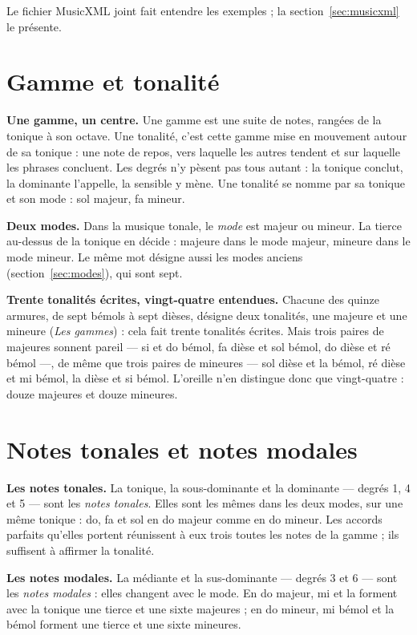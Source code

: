 \documentclass[a4paper,11pt]{article}
\begin{document}
Le fichier MusicXML joint fait entendre les exemples ; la
section~\ref{sec:musicxml} le présente.

\section{Gamme et tonalité}
\label{sec:tonalite}

\textbf{Une gamme, un centre.} Une gamme est une suite de notes, rangées de la
tonique à son octave. Une tonalité, c'est cette gamme mise en mouvement autour
de sa tonique : une note de repos, vers laquelle les autres tendent et sur
laquelle les phrases concluent. Les degrés n'y pèsent pas tous autant : la
tonique conclut, la dominante l'appelle, la sensible y mène. Une tonalité se
nomme par sa tonique et son mode : sol majeur, fa mineur.

\textbf{Deux modes.} Dans la musique tonale, le \emph{mode} est majeur ou
mineur. La tierce au-dessus de la tonique en décide : majeure dans le mode
majeur, mineure dans le mode mineur. Le même mot désigne aussi les modes
anciens (section~\ref{sec:modes}), qui sont sept.

\textbf{Trente tonalités écrites, vingt-quatre entendues.} Chacune des quinze
armures, de sept bémols à sept dièses, désigne deux tonalités, une majeure et
une mineure (\emph{Les gammes}) : cela fait trente tonalités écrites. Mais
trois paires de majeures sonnent pareil --- si et do bémol, fa dièse et sol
bémol, do dièse et ré bémol ---, de même que trois paires de mineures --- sol
dièse et la bémol, ré dièse et mi bémol, la dièse et si bémol. L'oreille n'en
distingue donc que vingt-quatre : douze majeures et douze mineures.

\section{Notes tonales et notes modales}
\label{sec:tonales}

\textbf{Les notes tonales.} La tonique, la sous-dominante et la dominante ---
degrés 1, 4 et 5 --- sont les \emph{notes tonales}. Elles sont les mêmes dans
les deux modes, sur une même tonique : do, fa et sol en do majeur comme en do
mineur. Les accords parfaits qu'elles portent réunissent à eux trois toutes
les notes de la gamme ; ils suffisent à affirmer la tonalité.

\textbf{Les notes modales.} La médiante et la sus-dominante --- degrés 3 et 6
--- sont les \emph{notes modales} : elles changent avec le mode. En do majeur,
mi et la forment avec la tonique une tierce et une sixte majeures ; en do
mineur, mi bémol et la bémol forment une tierce et une sixte mineures.
\end{document}
